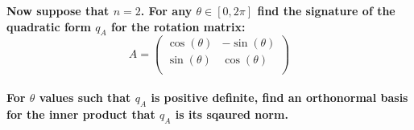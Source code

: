 \documentclass[11pt,a4paper]{article}
\theoremstyle{plain}
\begin{document}
	\noindent	\textbf{Now suppose that $n=2$. For any $\theta\in[0,2\pi]$ find the
	signature of the quadratic form $q_A$ for the rotation matrix:
	\[
		A = \begin{pmatrix}
			\cos(\theta) & -\sin(\theta)\\
			\sin(\theta) &  \cos(\theta)\\
		\end{pmatrix}
	\]} \\
	
	\noindent
	\textbf{For $\theta$ values such that $q_A$ is positive definite, find
	an orthonormal basis for the inner product that $q_A$ is its sqaured norm.}
	\\
	
	
\end{document}
